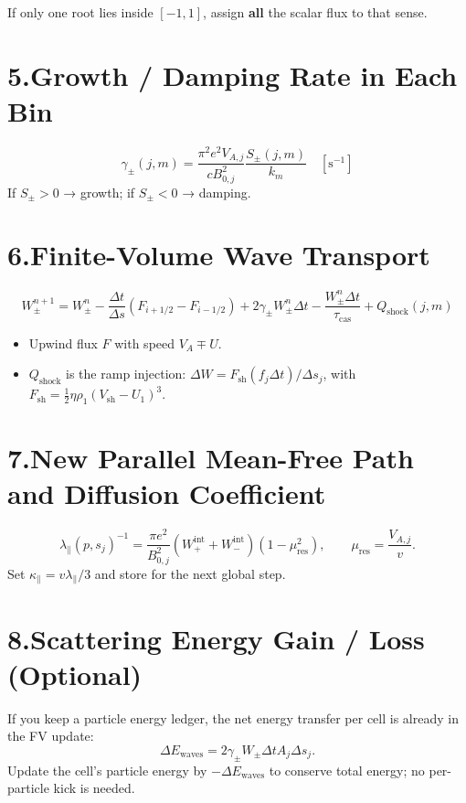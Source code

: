 If only one root lies inside $[-1,1]$, assign \textbf{all} the scalar flux to that sense.

\section*{5.\quad Growth / Damping Rate in Each Bin}

\[
\boxed{
\gamma_\pm(j,m) =
\frac{\pi^2 e^2 V_{A,j}}{c B_{0,j}^2}
\frac{S_\pm(j,m)}{k_m}
}
\quad [\text{s}^{-1}]
\]
If $S_\pm > 0$ → growth; if $S_\pm < 0$ → damping.

\section*{6.\quad Finite-Volume Wave Transport}

\[
W_\pm^{n+1} = W_\pm^{n}
- \frac{\Delta t}{\Delta s} (F_{i+1/2} - F_{i-1/2})
+ 2\gamma_\pm W_\pm^{n} \Delta t
- \frac{W_\pm^{n} \Delta t}{\tau_{\text{cas}}}
+ Q_{\text{shock}}(j, m)
\]
\begin{itemize}
\item Upwind flux $F$ with speed $V_A \mp U$.
\item $Q_{\text{shock}}$ is the ramp injection: $\Delta W = F_{\text{sh}} (f_j \Delta t) / \Delta s_j$, with $F_{\text{sh}} = \tfrac{1}{2} \eta \rho_1 (V_{\text{sh}} - U_1)^3$.
\end{itemize}

\section*{7.\quad New Parallel Mean-Free Path and Diffusion Coefficient}

\[
\lambda_\parallel(p, s_j)^{-1} =
\frac{\pi e^2}{B_{0,j}^2}
\left( W_{+}^{\text{int}} + W_{-}^{\text{int}} \right)
\left( 1 - \mu_{\text{res}}^2 \right),
\qquad
\mu_{\text{res}} = \frac{V_{A,j}}{v}.
\]
Set $\kappa_\parallel = v \lambda_\parallel / 3$ and store for the next global step.

\section*{8.\quad Scattering Energy Gain / Loss (Optional)}

If you keep a particle energy ledger, the net energy transfer per cell is already in the FV update:
\[
\Delta E_{\text{waves}} = 2\gamma_\pm W_\pm \Delta t A_j \Delta s_j.
\]
Update the cell’s particle energy by $-\Delta E_{\text{waves}}$ to conserve total energy; no per-particle kick is needed.

